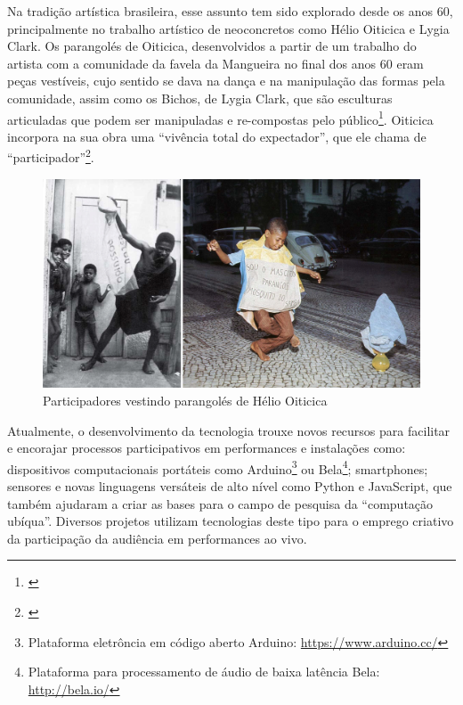 Na tradição artística brasileira, esse assunto tem sido explorado desde os anos 60, principalmente no trabalho artístico de neoconcretos como Hélio Oiticica e Lygia Clark. Os parangolés de Oiticica, desenvolvidos a partir de um trabalho do artista com a comunidade da favela da Mangueira no final dos anos 60 eram peças vestíveis, cujo sentido se dava na dança e na manipulação das formas pela comunidade, assim como os Bichos, de Lygia Clark, que são esculturas articuladas que podem ser manipuladas e re-compostas pelo público\footnote{\cite{Braga2008}}. Oiticica incorpora na sua obra uma ``vivência total do expectador'', que ele chama de ``participador''\footnote{\cite{Oiticica1986}}.

\begin{figure}
    \caption{\label{parangole}Participadores vestindo parangolés de Hélio Oiticica}
    \begin{center}
        \includegraphics[width=1\linewidth]{pictures/cap3/parangole}
    \end{center}
\end{figure}

Atualmente, o desenvolvimento da tecnologia trouxe novos recursos para facilitar e encorajar processos participativos em performances e instalações como: dispositivos computacionais portáteis como Arduino\footnote{Plataforma eletrôncia em código aberto Arduino: \url{https://www.arduino.cc/}} ou Bela\footnote{Plataforma para processamento de áudio de baixa latência Bela: \url{http://bela.io/}}; smartphones; sensores e novas linguagens versáteis de alto nível como Python e JavaScript, que também ajudaram a criar as bases para o campo de pesquisa da ``computação ubíqua''. Diversos projetos utilizam tecnologias deste tipo para o emprego criativo da participação da audiência em performances ao vivo.

